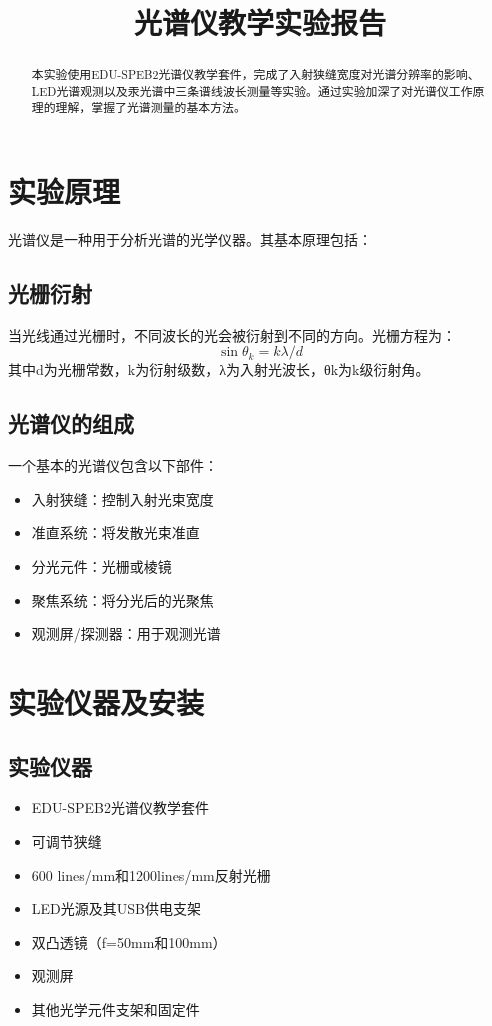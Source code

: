 \documentclass{ctexart}
\title{光谱仪教学实验报告}
\begin{document}
\maketitle

\begin{abstract}
本实验使用EDU-SPEB2光谱仪教学套件，完成了入射狭缝宽度对光谱分辨率的影响、LED光谱观测以及汞光谱中三条谱线波长测量等实验。通过实验加深了对光谱仪工作原理的理解，掌握了光谱测量的基本方法。
\end{abstract}

\section{实验原理}

光谱仪是一种用于分析光谱的光学仪器。其基本原理包括：

\subsection{光栅衍射}
当光线通过光栅时，不同波长的光会被衍射到不同的方向。光栅方程为：
\[ \sin \theta_k = k\lambda/d \]
其中d为光栅常数，k为衍射级数，λ为入射光波长，θk为k级衍射角。

\subsection{光谱仪的组成}
一个基本的光谱仪包含以下部件：
\begin{itemize}
    \item 入射狭缝：控制入射光束宽度
    \item 准直系统：将发散光束准直
    \item 分光元件：光栅或棱镜
    \item 聚焦系统：将分光后的光聚焦
    \item 观测屏/探测器：用于观测光谱
\end{itemize}

\section{实验仪器及安装}
\subsection{实验仪器}
\begin{itemize}
    \item EDU-SPEB2光谱仪教学套件
    \item 可调节狭缝
    \item 600 lines/mm和1200lines/mm反射光栅
    \item LED光源及其USB供电支架
    \item 双凸透镜（f=50mm和100mm）
    \item 观测屏
    \item 其他光学元件支架和固定件
\end{itemize}
\end{document}
